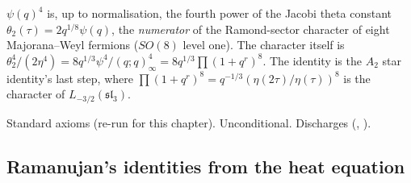\begin{physics}
$\psi(q)^4$ is, up to normalisation, the fourth power of the Jacobi theta constant $\theta_2(\tau)=2q^{1/8}\psi(q)$, the \emph{numerator} of the
Ramond-sector character of eight Majorana--Weyl fermions ($SO(8)$ level one). The character itself is
$\theta_2^4/(2\eta^4)=8q^{1/3}\psi^4/(q;q)_\infty^4=8q^{1/3}\prod(1+q^r)^8$. The identity is the $A_2$ star identity's
last step, where $\prod(1+q^r)^8=q^{-1/3}(\eta(2\tau)/\eta(\tau))^8$ is the character of
$L_{-3/2}(\mathfrak{sl}_3)$.
\end{physics}
\begin{status}
Standard axioms (re-run for this chapter). Unconditional. Discharges 
(, ).
\end{status}

\subsection{Ramanujan's identities from the heat equation}


